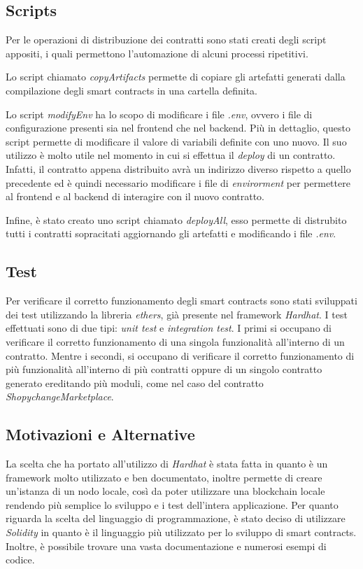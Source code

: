 \subsection{Scripts}

Per le operazioni di distribuzione dei contratti sono stati creati degli script appositi, i quali permettono l'automazione di alcuni processi ripetitivi.

Lo script chiamato \textit{copyArtifacts} permette di copiare gli artefatti generati dalla compilazione degli smart contracts in una cartella definita.

Lo script \textit{modifyEnv} ha lo scopo di modificare i file \textit{.env}, ovvero i file di configurazione presenti sia nel frontend che nel backend. Più in dettaglio, questo script permette di modificare il valore di variabili definite con uno nuovo. Il suo utilizzo è molto utile nel momento in cui si effettua il \textit{deploy} di un contratto. Infatti, il contratto appena distribuito avrà un indirizzo diverso rispetto a quello precedente ed è quindi necessario modificare i file di \textit{envirorment} per permettere al frontend e al backend di interagire con il nuovo contratto.

Infine, è stato creato uno script chiamato \textit{deployAll}, esso permette di distrubito tutti i contratti sopracitati aggiornando gli artefatti e modificando i file \textit{.env}.

\subsection{Test}

Per verificare il corretto funzionamento degli smart contracts sono stati sviluppati dei test utilizzando la libreria \textit{ethers}, già presente nel framework \textit{Hardhat}. I test effettuati sono di due tipi: \textit{unit test} e \textit{integration test}.
I primi si occupano di verificare il corretto funzionamento di una singola funzionalità all'interno di un contratto. Mentre i secondi, si occupano di verificare il corretto funzionamento di più funzionalità all'interno di più contratti oppure di un singolo contratto generato ereditando più moduli, come nel caso del contratto \textit{ShopychangeMarketplace}.

\subsection{Motivazioni e Alternative}

La scelta che ha portato all'utilizzo di \textit{Hardhat} è stata fatta in quanto è un framework molto utilizzato e ben documentato, inoltre permette di creare un'istanza di un nodo locale, così da poter utilizzare una blockchain locale rendendo più semplice lo sviluppo e i test dell'intera applicazione. Per quanto riguarda la scelta del linguaggio di programmazione, è stato deciso di utilizzare \textit{Solidity} in quanto è il linguaggio più utilizzato per lo sviluppo di smart contracts. Inoltre, è possibile trovare una vasta documentazione e numerosi esempi di codice. 

